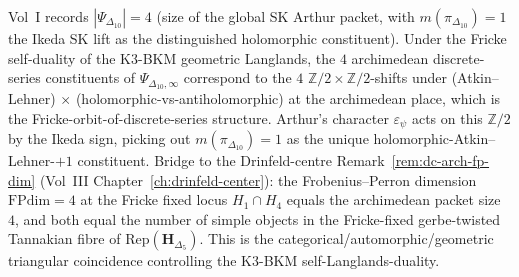 \begin{remark}
\label{rem:gl-arthur-bridge}
Vol~I \cite{VolI} records
$|\Psi_{\Delta_{10}}| = 4$ (size of the global SK Arthur packet, with
$m(\pi_{\Delta_{10}}) = 1$ the Ikeda SK lift as the distinguished
holomorphic constituent). Under the Fricke self-duality of
the K3-BKM geometric Langlands, the $4$ archimedean discrete-series
constituents of $\Psi_{\Delta_{10}, \infty}$ correspond to the $4$
$\mathbb{Z}/2 \times \mathbb{Z}/2$-shifts under (Atkin--Lehner)
$\times$ (holomorphic-vs-antiholomorphic) at the archimedean place,
which is the Fricke-orbit-of-discrete-series structure. Arthur's
character $\varepsilon_\psi$ acts on this $\mathbb{Z}/2$ by the
Ikeda sign, picking out $m(\pi_{\Delta_{10}}) = 1$ as the unique
holomorphic-Atkin--Lehner-$+1$ constituent. Bridge to the
Drinfeld-centre Remark~\ref{rem:dc-arch-fp-dim}
(Vol~III Chapter~\ref{ch:drinfeld-center}): the
Frobenius--Perron dimension $\mathrm{FPdim} = 4$ at the Fricke fixed
locus $H_1 \cap H_4$ equals the archimedean packet size $4$, and
both equal the number of simple objects in the Fricke-fixed
gerbe-twisted Tannakian fibre of $\mathrm{Rep}(\mathbf{H}_{\Delta_5})$.
This is the categorical/automorphic/geometric triangular
coincidence controlling the K3-BKM self-Langlands-duality.
\end{remark}

